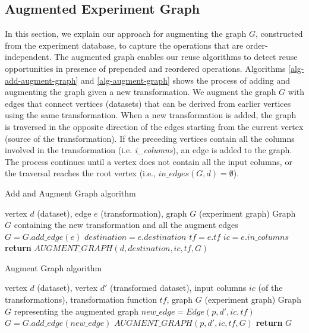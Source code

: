 \subsection{Augmented Experiment Graph}
In this section, we explain our approach for augmenting the graph $G$, constructed from the experiment database, to capture the operations that are order-independent.
The augmented graph enables our reuse algorithms to detect reuse opportunities in presence of prepended and reordered operations.
Algorithms \ref{alg-add-augment-graph} and \ref{alg-augment-graph} shows the process of adding and augmenting the graph given a new transformation.
We augment the graph $G$ with edges that connect vertices (datasets) that can be derived from earlier vertices using the same transformation.
When a new transformation is added, the graph is traversed in the opposite direction of the edges starting from the current vertex (source of the transformation).
If the preceding vertices contain all the columns involved in the transformation (i.e. \textit{i\_columns}), an edge is added to the graph.
The process continues until a vertex does not contain all the input columns, or the traversal reaches the root vertex (i.e., $in\_edges(G,d) = \emptyset$).

\begin{algorithm}
\caption{Add and Augment Graph algorithm}\label{alg-add-augment-graph}
\begin{algorithmic}[1]
\Require vertex $d$ (dataset), edge $e$ (transformation), graph $G$ (experiment graph)
\Ensure Graph $G$ containing the new transformation and all the augment edges
	\State $G = G.add\_edge(e)$ 
	\State $destination = e.destination$ 
	\State $tf=e.tf$ 
	\State $ic=e.in\_columns$ 
	\State \textbf{return} $AUGMENT\_GRAPH(d, destination,ic, tf, G)$   
\EndFunction
\end{algorithmic}
\end{algorithm}

\begin{algorithm}
\caption{Augment Graph algorithm}\label{alg-augment-graph}
\begin{algorithmic}[1]
\Require vertex $d$ (dataset), vertex $d'$ (transformed dataset), input columns $ic$ (of the transformations), transformation function $tf$, graph $G$ (experiment graph)
\Ensure Graph $G$ representing the augmented graph
			\State  $new\_edge=Edge(p, d', ic,tf)$
			\State $G = G.add\_edge(new\_edge)$
			\State  $AUGMENT\_GRAPH(p, d',ic, tf,G)$
		\EndIf
	\EndFor
   \State \textbf{return} $G$
\EndFunction
\end{algorithmic}
\end{algorithm}


